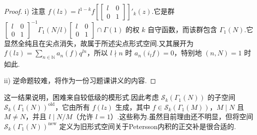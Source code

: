\begin{proof}

i) 注意 $f(lz)=l^{1-k}f[\left[\begin{smallmatrix}l&0\\0&1\end{smallmatrix}\right]]'_k(z)$.它是群 $\left[\begin{smallmatrix}l&0\\0&1\end{smallmatrix}\right]^{-1}\Gamma_1(N/l)\left[\begin{smallmatrix}l&0\\0&1\end{smallmatrix}\right]\cap\Gamma(1)$ 的权 $k$ 自守函数，而该群包含 $\Gamma_1(N)$.它显然全纯且在尖点消失，故属于所述尖点形式空间.又其展开为 $f(lz)=\sum_{n\in\mathbb N}a_n(f)q^{ln}$，所以 $l\nmid n$ 时 $a_n(i_lf)=0$，特别地 $(n,N)=1$ 时如此.

ii) 逆命题较难，将作为一份习题课讲义的内容.

\end{proof}

这一结果说明，困难来自较低级的模形式.因此考虑 $\mathcal S_k(\Gamma_1(N))$ 的子空间 $\mathcal S_k(\Gamma_1(N))^{\mathrm{old}}$，它由所有 $f(lz)$ 生成，其中 $f\in\mathcal S_k(\Gamma_1(M))$，$M\mid N$ 且 $M\ne N$，并且 $l\mid N/M$（允许 $l=1$）.这些称为.虽然目前理由还不明显，但将空间 $\mathcal S_k(\Gamma_1(N))^{\mathrm{new}}$ 定义为旧形式空间关于Petersson内积的正交补是很合适的.

